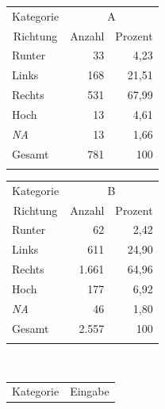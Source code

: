 \begin{table}
    \begin{minipage}{0.5\textwidth}\centering
        \begin{tabular}{lrr} \lsptoprule
         Kategorie & \multicolumn{2}{c}{{A}} \\ 
         \cmidrule(lr){2-3}
            \multicolumn{1}{c}{Richtung} & \multicolumn{1}{c}{Anzahl} & \multicolumn{1}{c}{Prozent} \\ 
            \midrule
            Runter & 33 & 4,23 \\ 
            Links & 168 & 21,51 \\ 
            Rechts & 531 & 67,99 \\ 
            Hoch & 13 & 4,61 \\ 
            \emph{NA} & 13 & 1,66 \\
            \midrule
            {Gesamt} & 781 & 100 \\ 
            \lspbottomrule
            \end{tabular}
            \end{minipage}\begin{minipage}{0.5\textwidth}\centering
            \begin{tabular}{lrr} 
            \lsptoprule
            Kategorie & \multicolumn{2}{c}{{B}} \\ 
            \cmidrule(lr){2-3}
            \multicolumn{1}{c}{Richtung} & \multicolumn{1}{c}{Anzahl} & \multicolumn{1}{c}{Prozent}  \\ 
            \midrule
            Runter & 62 & 2,42 \\ 
            Links & 611 & 24,90 \\ 
            Rechts & 1.661 & 64,96 \\ 
            Hoch & 177 & 6,92 \\ 
            \emph{NA} & 46 & 1,80 \\ 
            \midrule
            {Gesamt} & 2.557 & 100 \\ 
            \lspbottomrule
         \end{tabular}    
    \end{minipage}\medskip\\
    \begin{minipage}{0.5\textwidth}\centering
            \begin{tabular}{lrr} 
            \lsptoprule
            Kategorie & \multicolumn{2}{c}{{Eingabe}} \\ 
            \cmidrule(lr){2-3}

\end{tabular}
\end{minipage}
\end{table}
